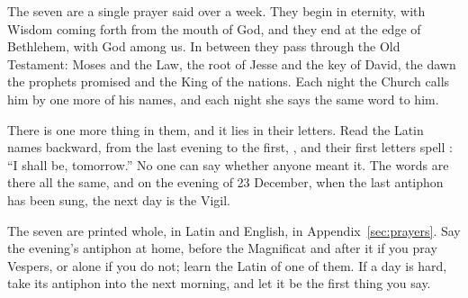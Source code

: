 The seven are a single prayer said over a week. They begin in eternity, with
Wisdom coming forth from the mouth of God, and they end at the edge of
Bethlehem, with God among us. In between they pass through the Old Testament:
Moses and the Law, the root of Jesse and the key of David, the dawn the
prophets promised and the King of the nations. Each night the Church calls him
by one more of his names, and each night she says the same word to him.

There is one more thing in them, and it lies in their letters. Read the Latin
names backward, from the last evening to the first, , and their first letters spell
: ``I shall be, tomorrow.'' No one can say whether anyone meant
it. The words are there all the same, and on the evening of 23 December, when
the last antiphon has been sung, the next day is the Vigil.

The seven are printed whole, in Latin and English, in
Appendix~\ref{sec:prayers}. Say the evening's antiphon at home, before the
Magnificat and after it if you pray Vespers, or alone if you do not; learn the
Latin of one of them. If a day is hard, take its antiphon into the next
morning, and let it be the first thing you say.
